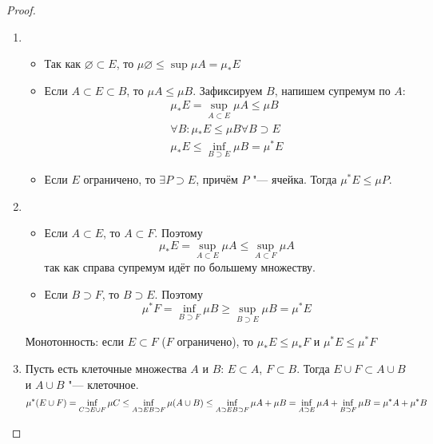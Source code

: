 \begin{proof}
	\begin{enumerate}
	\item
		\begin{itemize}
		\item
			Так как $\varnothing \subset E$, то $\mu \varnothing \le \sup \mu A = \mu_* E$
		\item
			Если $A \subset E \subset B$, то $\mu A \le \mu B$.
			Зафиксируем $B$, напишем супремум по $A$:
			\begin{gather*}
				\mu_* E = \sup_{A \subset E} \mu A \le \mu B \\
				\forall B \colon \mu_* E \le \mu B \forall B \supset E \\
				\mu_* E \le \inf_{B \supset E} \mu B = \mu^* E
			\end{gather*}
		\item
			Если $E$ ограничено, то $\exists P \supset E$, причём $P$ "--- ячейка.
			Тогда $\mu^* E \le \mu P$.
		\end{itemize}
	\item
		\begin{itemize}
		\item
			Если $A \subset E$, то $A \subset F$.
			Поэтому
			\[\mu_*E = \sup_{A \subset E} \mu A \le \sup_{A \subset F} \mu A\]
			так как справа супремум идёт по большему множеству.
		\item
			Если $B \supset F$, то $B \supset E$.
			Поэтому
			\[\mu^*F = \inf_{B \supset F} \mu B \ge \sup_{B \supset E} \mu B = \mu^* E\]
		\end{itemize}
		Монотонность: если $E \subset F$ ($F$ ограничено), то
		$\mu_* E \le \mu_* F$ и $\mu^* E \le \mu^* F$
	\item
		Пусть есть клеточные множества $A$ и $B$: $E \subset A$, $F \subset B$.
		Тогда $E \cup F \subset A \cup B$ и $A \cup B$ "--- клеточное.
		\[
		\mu^* (E \cup F)
		= \inf_{C \supset E \cup F} \mu C
		\le \inf_{A \supset E\\ B \supset F} \mu(A \cup B)
		\le \inf_{A \supset E\\ B \supset F} \mu A + \mu B
		= \inf_{A \supset E} \mu A + \inf_{B \supset F} \mu B
		= \mu^* A + \mu^* B
		\]
	\end{enumerate}
\end{proof}

